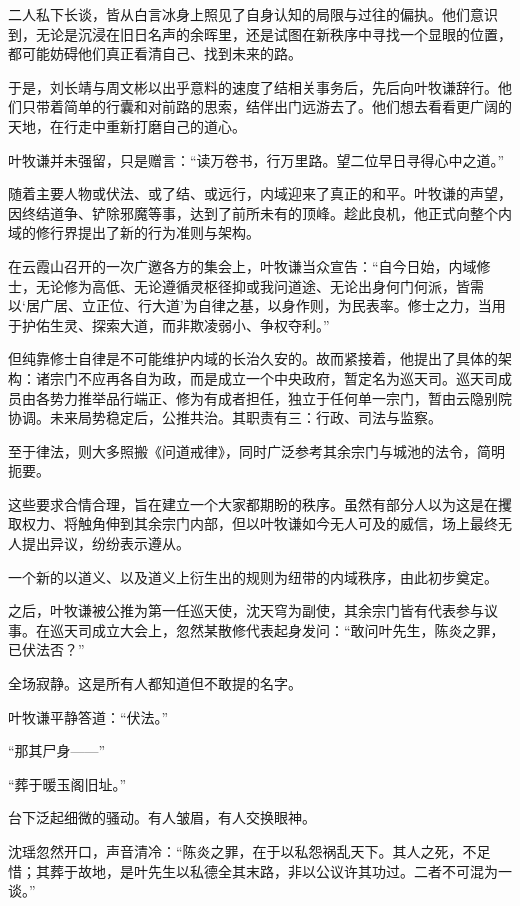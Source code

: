 二人私下长谈，皆从白言冰身上照见了自身认知的局限与过往的偏执。他们意识到，无论是沉浸在旧日名声的余晖里，还是试图在新秩序中寻找一个显眼的位置，都可能妨碍他们真正看清自己、找到未来的路。

于是，刘长靖与周文彬以出乎意料的速度了结相关事务后，先后向叶牧谦辞行。他们只带着简单的行囊和对前路的思索，结伴出门远游去了。他们想去看看更广阔的天地，在行走中重新打磨自己的道心。

叶牧谦并未强留，只是赠言：“读万卷书，行万里路。望二位早日寻得心中之道。”

\vspace{2em}

随着主要人物或伏法、或了结、或远行，内域迎来了真正的和平。叶牧谦的声望，因终结道争、铲除邪魔等事，达到了前所未有的顶峰。趁此良机，他正式向整个内域的修行界提出了新的行为准则与架构。

在云霞山召开的一次广邀各方的集会上，叶牧谦当众宣告：“自今日始，内域修士，无论修为高低、无论遵循灵枢径抑或我问道途、无论出身何门何派，皆需以‘居广居、立正位、行大道’为自律之基，以身作则，为民表率。修士之力，当用于护佑生灵、探索大道，而非欺凌弱小、争权夺利。”

但纯靠修士自律是不可能维护内域的长治久安的。故而紧接着，他提出了具体的架构：诸宗门不应再各自为政，而是成立一个中央政府，暂定名为巡天司。巡天司成员由各势力推举品行端正、修为有成者担任，独立于任何单一宗门，暂由云隐别院协调。未来局势稳定后，公推共治。其职责有三：行政、司法与监察。

至于律法，则大多照搬《问道戒律》，同时广泛参考其余宗门与城池的法令，简明扼要。

这些要求合情合理，旨在建立一个大家都期盼的秩序。虽然有部分人以为这是在攫取权力、将触角伸到其余宗门内部，但以叶牧谦如今无人可及的威信，场上最终无人提出异议，纷纷表示遵从。

一个新的以道义、以及道义上衍生出的规则为纽带的内域秩序，由此初步奠定。

之后，叶牧谦被公推为第一任巡天使，沈天穹为副使，其余宗门皆有代表参与议事。在巡天司成立大会上，忽然某散修代表起身发问：“敢问叶先生，陈炎之罪，已伏法否？”

全场寂静。这是所有人都知道但不敢提的名字。

叶牧谦平静答道：“伏法。”

“那其尸身——”

“葬于暖玉阁旧址。”

台下泛起细微的骚动。有人皱眉，有人交换眼神。

沈瑶忽然开口，声音清冷：“陈炎之罪，在于以私怨祸乱天下。其人之死，不足惜；其葬于故地，是叶先生以私德全其末路，非以公议许其功过。二者不可混为一谈。”

